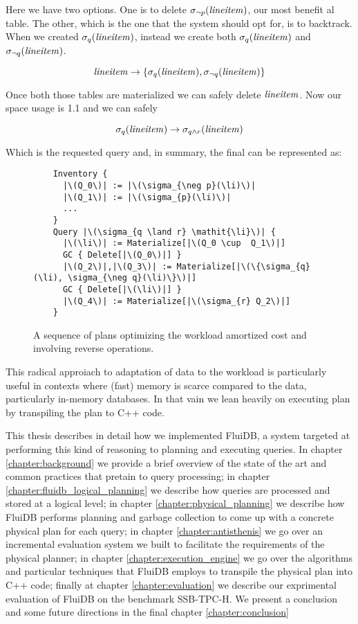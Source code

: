 Here we have two options. One is to delete \(\sigma_{\neg
  p}(\mathit{lineitem})\), our most benefit al table. The other, which is the one
that the system should opt for, is to backtrack. When we created
\(\sigma_{q}(\mathit{lineitem})\), instead we create both
\(\sigma_{q}(\mathit{lineitem})\) and \(\sigma_{\neg q}(\mathit{lineitem})\).

\[
  \mathit{lineitem} \rightarrow \{\sigma_{q}(\mathit{lineitem}), \sigma_{\neg q}(\mathit{lineitem})\}
\]

Once both those tables are materialized we can safely delete
\(\mathit{lineitem}\). Now our space usage is 1.1 and we can safely

\[
  \sigma_{q}(\mathit{lineitem}) \rightarrow \sigma_{q \land r} (\mathit{lineitem})
\]

Which is the requested query and, in summary, the final can be
represented as:


\begin{figure}[H]
\begin{verbatim}
    Inventory {
      |\(Q_0\)| := |\(\sigma_{\neg p}(\li)\)|
      |\(Q_1\)| := |\(\sigma_{p}(\li)\)|
      ...
    }
    Query |\(\sigma_{q \land r} \mathit{\li}\)| {
      |\(\li\)| := Materialize[|\(Q_0 \cup  Q_1\)|]
      GC { Delete[|\(Q_0\)|] }
      |\(Q_2\)|,|\(Q_3\)| := Materialize[|\(\{\sigma_{q}(\li), \sigma_{\neg q}(\li)\}\)|]
      GC { Delete[|\(\li\)|] }
      |\(Q_4\)| := Materialize[|\(\sigma_{r} Q_2\)|]
    }
\end{verbatim}
  \caption{\label{fig:reverse_operations}A sequence of plans optimizing
    the workload amortized cost and involving reverse operations.}
\end{figure}

This radical approiach to adaptation of data to the workload is
particularly useful in contexts where (fast) memory is scarce compared
to the data, particularly in-memory databases. In that vain we lean
heavily on executing plan by transpiling the plan to C++ code.

This thesis describes in detail how we implemented FluiDB, a system
targeted at performing this kind of reasoning to planning and
executing queries. In chapter \ref{chapter:background} we provide a
brief overview of the state of the art and common practices that
pretain to query processing; in chapter
\ref{chapter:fluidb_logical_planning} we describe how queries are
processed and stored at a logical level; in chapter
\ref{chapter:physical_planning} we describe how FluiDB performs
planning and garbage collection to come up with a concrete physical
plan for each query; in chapter \ref{chapter:antisthenis} we go over
an incremental evaluation system we built to facilitate the
requirements of the physical planner; in chapter
\ref{chapter:execution_engine} we go over the algorithms and
particular techniques that FluiDB employs to transpile the physical
plan into C++ code; finally at chapter \ref{chapter:evaluation} we
describe our exprimental evaluation of FluiDB on the benchmark
SSB-TPC-H. We present a conclusion and some future directions in the
final chapter \ref{chapter:conclusion}
